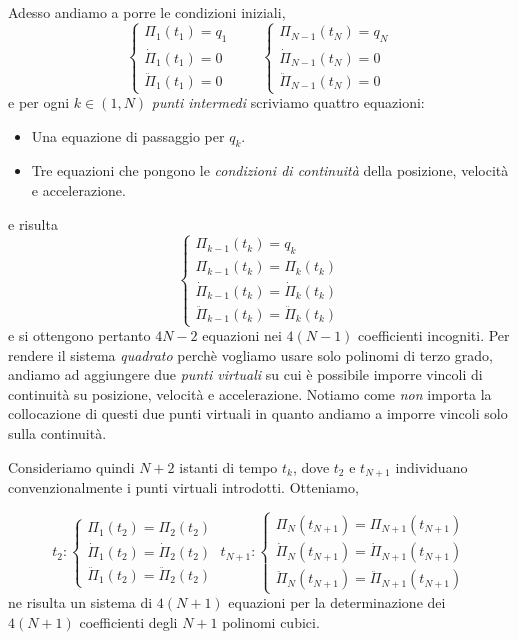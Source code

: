 \paragraph{}
Adesso andiamo a porre le condizioni iniziali,
\begin{equation}
	\begin{cases}
		\Pi_1(t_1) = q_1 \\
		\dot{\Pi}_1(t_1) = 0 \\
		\ddot{\Pi}_1(t_1) = 0 
	\end{cases}
	\qquad
	\begin{cases}
		\Pi_{N-1}(t_N) = q_N \\
		\dot{\Pi}_{N-1}(t_N) = 0 \\
		\ddot{\Pi}_{N-1}(t_N) = 0 
	\end{cases}
\end{equation}
e per ogni $k \in (1,N)$ \emph{punti intermedi} scriviamo quattro equazioni:
\begin{itemize}
	\item Una equazione di passaggio per $q_k$.
	\item Tre equazioni che pongono le \emph{condizioni di continuità} della posizione, velocità e accelerazione.
\end{itemize}
e risulta
\begin{equation}
	\begin{cases}
		\Pi_{k-1}(t_k) = q_k \\
		\Pi_{k-1}(t_k) = \Pi_{k}(t_k) \\
		\dot{\Pi}_{k-1}(t_k) = \dot{\Pi}_{k}(t_k) \\
		\ddot{\Pi}_{k-1}(t_k) = \ddot{\Pi}_{k}(t_k)
	\end{cases}
\end{equation}
e si ottengono pertanto $4N-2$ equazioni nei $4(N-1)$ coefficienti incogniti. Per rendere il sistema \emph{quadrato} perchè vogliamo usare solo polinomi di terzo grado, andiamo ad aggiungere due \emph{punti virtuali} su cui è possibile imporre vincoli di continuità su posizione, velocità e accelerazione. Notiamo come \emph{non} importa la collocazione di questi due punti virtuali in quanto andiamo a imporre vincoli solo sulla continuità. 

Consideriamo quindi $N+2$ istanti di tempo $t_k$, dove $t_2$ e $t_{N+1}$ individuano convenzionalmente i punti virtuali introdotti. Otteniamo,

\begin{equation}
t_2: 
\begin{cases}
	\Pi_1(t_2) = \Pi_2(t_2) \\
	\dot{\Pi}_1(t_2) = \dot{\Pi}_2(t_2) \\
	\ddot{\Pi}_1(t_2) = \ddot{\Pi}_2(t_2) 
\end{cases}
\;
t_{N+1}:
\begin{cases}
	\Pi_N(t_{N+1}) = \Pi_{N+1}(t_{N+1}) \\
	\dot{\Pi}_N(t_{N+1}) = \dot{\Pi}_{N+1}(t_{N+1}) \\
	\ddot{\Pi}_N(t_{N+1}) = \ddot{\Pi}_{N+1}(t_{N+1})
\end{cases}
\end{equation}
ne risulta un sistema di $4(N+1)$ equazioni per la determinazione dei $4(N+1)$ coefficienti degli $N+1$ polinomi cubici.

